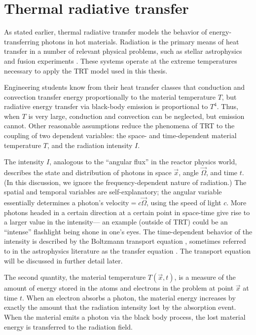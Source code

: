 \section{Thermal radiative transfer}

As stated earlier, thermal radiative transfer models the behavior of
energy-transferring photons in hot materials. Radiation is the primary means of
heat transfer in a number of relevant physical problems, such as stellar
astrophysics and fusion experiments \cite{Pom1973,Mih1984}. These systems
operate at the extreme
temperatures necessary to apply the TRT model used in this thesis.

Engineering students know from their heat transfer classes that conduction and
convection transfer energy proportionally to the material
temperature $T$, but radiative energy transfer via black-body emission is
proportional to $T^4$. Thus, when $T$ is very large, conduction and convection
can be neglected, but emission cannot. Other reasonable assumptions
reduce the phenomena of
TRT to the coupling of two dependent variables: the space- and time-dependent material
temperature $T$, and the radiation intensity $I$.

The intensity $I$, analogous to the ``angular flux'' in the reactor physics
world,
describes the state and distribution of photons in space $\vec{x}$, angle
$\vec{\Omega}$, and time $t$.
(In this discussion, we ignore the frequency-dependent nature of radiation.)
The spatial and temporal variables are self-explanatory; the angular
variable essentially determines a photon's velocity${}=c\vec{\Omega}$, using
the speed of light $c$. More photons headed in a certain direction at a certain
point in space-time give rise to a larger value in the intensity---%
an example (outside of TRT) could be an ``intense'' flashlight being shone in
one's eyes.  The time-dependent behavior of the intensity is described by the
Boltzmann transport equation \cite{Dud1976}, sometimes referred to in the
astrophysics literature as the transfer equation \cite{Mih1984}.
The transport equation will be discussed in further detail later.

The second quantity, the material temperature $T(\vec{x},t)$, is a measure of
the amount
of energy stored in the atoms and electrons in the problem at point
$\vec{x}$ at time $t$. When an electron
absorbs a photon, the material energy increases by exactly the amount that the
radiation intensity lost by the absorption event. When the material emits a
photon via the black body process, the lost material energy is transferred to
the radiation field.

